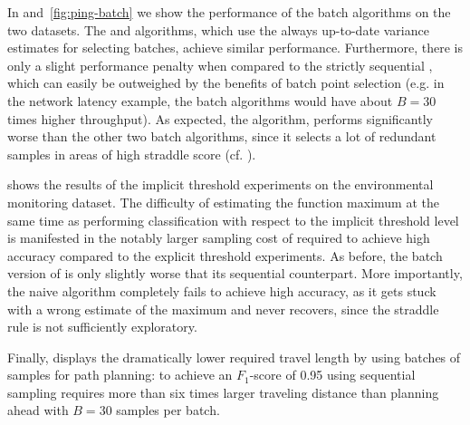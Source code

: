 In  and~\ref{fig:ping-batch} we show the performance
of the batch algorithms on the two datasets. The \bacl and \bstr algorithms,
which use the always up-to-date variance estimates for selecting batches,
achieve similar performance. Furthermore, there is only a slight performance
penalty when compared to the strictly sequential \str, which can easily be
outweighed by the benefits of batch point selection (e.g. in the network
latency example, the batch algorithms would have about $B = 30$ times higher
throughput). As expected, the \rstr algorithm, performs significantly
worse than the other two batch algorithms, since it selects a lot of
redundant samples in areas of high straddle score
(cf. ).

 shows the results of the implicit threshold experiments
on the environmental monitoring dataset. The difficulty of estimating the
function maximum at the same time as performing classification with respect to
the implicit threshold level is manifested in the notably larger sampling cost
of \iacl required to achieve high accuracy compared to the explicit threshold
experiments. As before, the batch version of
\iacl is only slightly worse that its sequential counterpart.
More importantly, the naive \istr algorithm completely
fails to achieve high accuracy, as it gets stuck with a wrong estimate of
the maximum and never recovers, since the straddle rule is not
sufficiently exploratory.

Finally,  displays the dramatically lower required travel
length by using batches of samples for path planning: to achieve
an $F_1$-score of 0.95 using sequential sampling requires more than six times
larger traveling distance than planning ahead with $B = 30$
samples per batch.